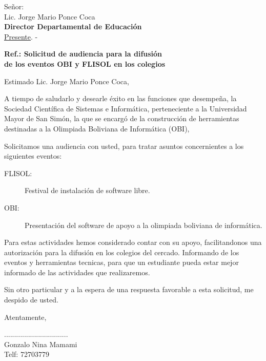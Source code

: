 \documentclass[letterpaper,12pt]{letter}
\begin{document}
\date{Cochabamba, 05 de Marzo de 2013}
\begin{letter}{
    Señor: \\
    Lic. Jorge Mario Ponce Coca \\
    \textbf{Director Departamental de Educación}\\
    \underline {Presente}. -
}

\begin{center}
    \opening{\textbf{Ref.: Solicitud de audiencia para la difusión \\
    de los eventos OBI y FLISOL en los colegios}}
\end{center}

Estimado Lic. Jorge Mario Ponce Coca, 

A tiempo de saludarlo y desearle éxito en las funciones que 
desempeña, la Sociedad Científica de Sistemas e Informática, perteneciente
a la Universidad Mayor de San Simón, la que se encargó de la construcción de
herramientas destinadas a la Olimpiada Boliviana de Informática (OBI), 

Solicitamos una audiencia con usted, para tratar asuntos concernientes a los
siguientes eventos:

\begin{description}
	\item[FLISOL:] Festival de instalación de software libre.
	\item[OBI:] Presentación del software de apoyo a la olimpiada boliviana de informática.

\end{description}

Para estas actividades hemos considerado contar con su apoyo, facilitandonos una
autorización para la difusión en los colegios del cercado. Informando de los 
eventos y herramientas tecnicas, para que un estudiante pueda estar mejor informado
de las actividades que realizaremos.

Sin otro particular y a la espera de una respuesta favorable a esta 
solicitud, me despido de usted.

Atentamente, 

\vspace{0.70cm}

\begin{center}
................................\\
Gonzalo Nina Mamami \\
Telf: 72703779 \\
\end{center}
\end{letter}
\end{document}
